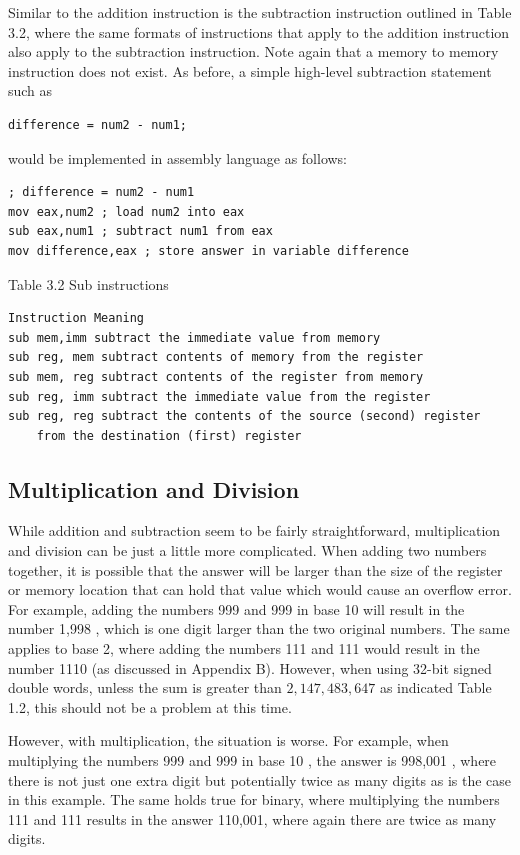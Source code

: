 \documentclass[10pt]{article}
\begin{document}
Similar to the addition instruction is the subtraction instruction outlined in Table 3.2, where the same formats of instructions that apply to the addition instruction also apply to the subtraction instruction. Note again that a memory to memory instruction does not exist. As before, a simple high-level subtraction statement such as

\begin{verbatim}
difference = num2 - num1;
\end{verbatim}

would be implemented in assembly language as follows:

\begin{verbatim}
; difference = num2 - num1
mov eax,num2 ; load num2 into eax
sub eax,num1 ; subtract num1 from eax
mov difference,eax ; store answer in variable difference
\end{verbatim}

Table 3.2 Sub instructions

\begin{verbatim}
Instruction Meaning
sub mem,imm subtract the immediate value from memory
sub reg, mem subtract contents of memory from the register
sub mem, reg subtract contents of the register from memory
sub reg, imm subtract the immediate value from the register
sub reg, reg subtract the contents of the source (second) register
    from the destination (first) register
\end{verbatim}

\subsection*{Multiplication and Division}
While addition and subtraction seem to be fairly straightforward, multiplication and division can be just a little more complicated. When adding two numbers together, it is possible that the answer will be larger than the size of the register or memory location that can hold that value which would cause an overflow error. For example, adding the numbers 999 and 999 in base 10 will result in the number 1,998 , which is one digit larger than the two original numbers. The same applies to base 2, where adding the numbers 111 and 111 would result in the number 1110 (as discussed in Appendix B). However, when using 32-bit signed double words, unless the sum is greater than $2,147,483,647$ as indicated Table 1.2, this should not be a problem at this time.

However, with multiplication, the situation is worse. For example, when multiplying the numbers 999 and 999 in base 10 , the answer is 998,001 , where there is not just one extra digit but potentially twice as many digits as is the case in this example. The same holds true for binary, where multiplying the numbers 111 and 111 results in the answer 110,001, where again there are twice as many digits.
\end{document}
